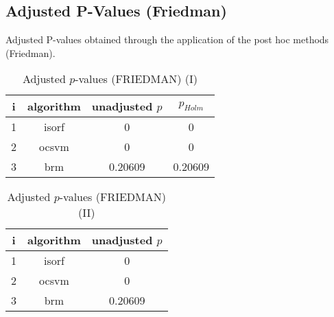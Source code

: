 \documentclass[a4paper,10pt]{article}
\begin{document}
\begin{landscape}
\newpage

\section{Adjusted P-Values (Friedman)}


Adjusted P-values obtained through the application of the post hoc methods (Friedman).

\begin{table}[!htp]
\centering\small
\begin{tabular}{cccc}
i&algorithm&unadjusted $p$&$p_{Holm}$\\
\hline1&isorf&0&0\\2&ocsvm&0&0\\3&brm&0.20609&0.20609\\\hline
\end{tabular}
\caption{Adjusted $p$-values (FRIEDMAN) (I)}
\end{table}
\begin{table}[!htp]
\centering\small
\begin{tabular}{ccc}
i&algorithm&unadjusted $p$\\
\hline1&isorf&0\\2&ocsvm&0\\3&brm&0.20609\\\hline
\end{tabular}
\caption{Adjusted $p$-values (FRIEDMAN) (II)}
\end{table}

\newpage
\end{landscape}
\end{document}
